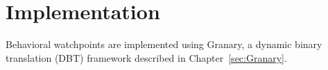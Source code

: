 \section{Implementation}
Behavioral watchpoints are implemented using Granary, a dynamic binary translation (DBT) framework \cite{GranaryAtOSDI} described in Chapter~\ref{sec:Granary}. %
%
%
%
%
%
%
%
